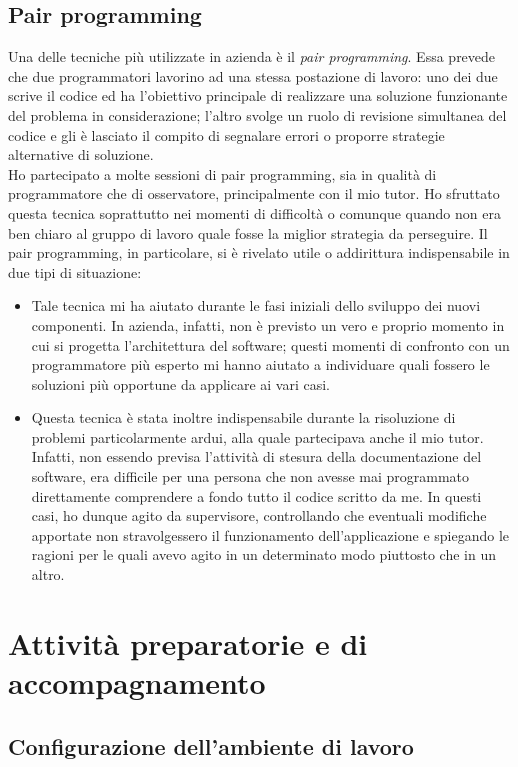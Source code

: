 		\subsection{Pair programming}
			Una delle tecniche più utilizzate in azienda è il \emph{pair programming}. Essa prevede che due programmatori lavorino
			ad una stessa postazione di lavoro: uno dei due scrive il codice ed ha l'obiettivo principale di realizzare una soluzione
			funzionante del problema in considerazione; l'altro svolge un ruolo di revisione simultanea del codice e gli è lasciato il
			compito di segnalare errori o proporre strategie alternative di soluzione.\\
			Ho partecipato a molte sessioni di pair programming, sia in qualità di programmatore che di osservatore, principalmente con
			il mio tutor. Ho sfruttato questa tecnica soprattutto nei momenti di difficoltà o comunque quando non era ben chiaro al
			gruppo di lavoro quale fosse la miglior strategia da perseguire. Il pair programming, in particolare, si è rivelato utile o
			addirittura indispensabile in due tipi di situazione:
			\begin{itemize}
				\item Tale tecnica mi ha aiutato durante le fasi iniziali dello sviluppo dei nuovi componenti. In azienda, infatti,
				non è previsto un vero e proprio momento in cui si progetta l'architettura del software; questi momenti di
				confronto con un programmatore più esperto mi hanno aiutato a individuare quali fossero le soluzioni più opportune
				da applicare ai vari casi.
				\item Questa tecnica è stata inoltre indispensabile durante la risoluzione di problemi particolarmente ardui, alla
				quale partecipava anche il mio tutor. Infatti, non essendo previsa l'attività di stesura della documentazione del
				software, era difficile per una persona che non avesse mai programmato direttamente comprendere a fondo tutto il
				codice scritto da me. In questi casi, ho dunque agito da supervisore, controllando che eventuali modifiche apportate
				non stravolgessero il funzionamento dell'applicazione e spiegando le ragioni per le quali avevo agito in un
				determinato modo piuttosto che in un altro.
			\end{itemize}
	\section{Attività preparatorie e di accompagnamento}
		\subsection{Configurazione dell'ambiente di lavoro}

